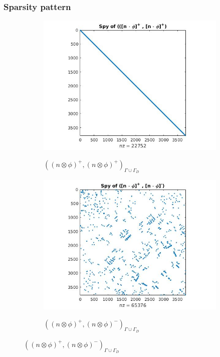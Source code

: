 \documentclass{beamer}
\begin{document}
\begin{frame}
\frametitle{Sparsity pattern}

\begin{figure}
  \begin{subfigure}{0.4\textwidth}
    \includegraphics[width=\linewidth]{figure21.jpg}
    \label{fig:figure21}
	\caption{$((n \otimes \phi)^+,(n \otimes \phi)^+)_{\Gamma \cup \Gamma_D}$}      
  \end{subfigure}
  \begin{subfigure}{0.35\textwidth}
    \includegraphics[width=\linewidth]{figure22.jpg}
    \label{fig:figure22}
	\caption{$((n \otimes \phi)^+,(n \otimes \phi)^-)_{\Gamma \cup \Gamma_D}$}      
  \end{subfigure}

\end{figure}
\end{frame}
\end{document}
